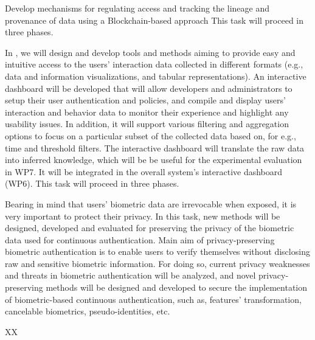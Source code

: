 \begin{Workpackage}{\thewpno}
\begin{Task}
\TaskResults{%
}
\TaskHeader{}

Develop mechanisms for regulating access and tracking the lineage and provenance of data using a Blockchain-based approach
This task will proceed in three phases. 
\end{Task}


\begin{Task}
\TaskResults{%
}
\TaskHeader{}

In \theTask, we will design and develop tools and methods aiming to provide easy and intuitive access to the users’ interaction data collected in different formats (e.g., data and information visualizations, and tabular representations). An interactive dashboard will be developed that will allow developers and administrators to setup their user authentication and policies, and compile and display users’ interaction and behavior data to monitor their experience and highlight any usability issues. In addition, it will support various filtering and aggregation options to focus on a particular subset of the collected data based on, for e.g., time and threshold filters. The interactive dashboard will translate the raw data into inferred knowledge, which will be be useful for the experimental evaluation in WP7. It will be integrated in the overall system's interactive dashboard (WP6). This task will proceed in three phases. 
\end{Task}

\begin{Task}
\TaskResults{%
}
\TaskHeader{}
Bearing in mind that users' biometric data are irrevocable when exposed, it is very important to protect their privacy. In this task, new methods will be designed, developed and evaluated for preserving the privacy of the biometric data used for continuous authentication. Main aim of privacy-preserving biometric authentication is to enable users to verify themselves without disclosing raw and sensitive biometric information. For doing so, current privacy weaknesses and threats in biometric authentication will be analyzed, and novel privacy-preserving methods will be designed and developed to secure the implementation of biometric-based continuous authentication, such as, features' transformation, cancelable biometrics, pseudo-identities, etc.
\end{Task}


\begin{WPDeliverables}
  \begin{compactitem}
    \item XX
\end{compactitem}
\end{WPDeliverables}
\end{Workpackage}
